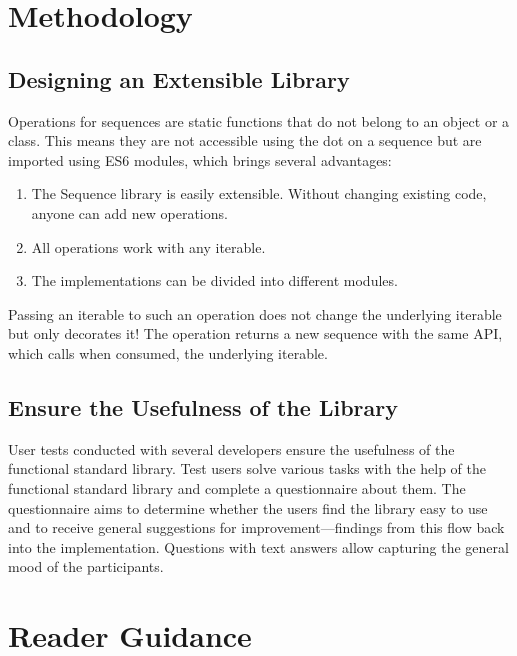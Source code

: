 

\section*{Methodology} %
\label{sec:Methodology}
\subsection*{Designing an Extensible Library} %
\label{sub:introd_Decorating iterables}
Operations for sequences are static functions that do not belong to an object
or a class. This means they are not accessible using the dot on a sequence but
are imported using ES6 modules, which brings several advantages:
\begin{enumerate}
  \item The Sequence library is easily extensible. Without changing existing
    code, anyone can add new operations.
  \item All operations work with any iterable.
  \item The implementations can be divided into different modules.
\end{enumerate}
Passing an iterable to such an operation does not change the underlying
iterable but only decorates it! The operation returns a new sequence with the
same API, which calls when consumed, the underlying iterable.

\subsection*{Ensure the Usefulness of the Library} %
\label{sub:User tests}
User tests conducted with several developers ensure the usefulness of the
functional standard library. Test users solve various tasks with the help of
the functional standard library and complete a questionnaire about them. The
questionnaire aims to determine whether the users find the library easy to use
and to receive general suggestions for improvement—findings from this flow back
into the implementation. Questions with text answers allow capturing the
general mood of the participants.

\section*{Reader Guidance} %
\label{sec:Reader Guidance}

